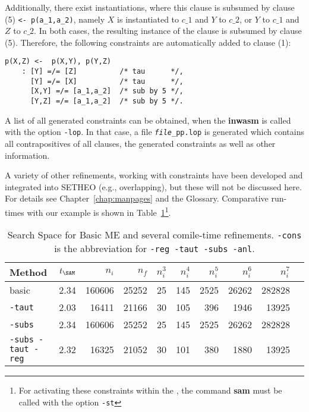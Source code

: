 Additionally, there exist instantiations, where this clause is subsumed
by clause (5) {\verb+<- p(a_1,a_2)+}, namely $X$ is instantiated
to $c\_1$ and $Y$ to $c\_2$, or $Y$ to $c\_1$ and $Z$ to $c\_2$.
In both cases, the resulting instance of the clause is subsumed by
clause (5).
Therefore, the following constraints are automatically added to
clause (1):

\begin{center}
\begin{verbatim}
p(X,Z) <-  p(X,Y), p(Y,Z)
    : [Y] =/= [Z]          /* tau      */, 
      [Y] =/= [X]          /* tau      */, 
      [X,Y] =/= [a_1,a_2]  /* sub by 5 */, 
      [Y,Z] =/= [a_1,a_2]  /* sub by 5 */.
\end{verbatim}
\end{center}

A list of all generated constraints can be obtained, when the {\bf inwasm}
is called with the option {\tt -lop}. In that case, a file 
{\tt {\em file}\_pp.lop} is generated which contains all contrapositives
of all clauses, the generated constraints as well as other information.

A variety of other refinements, working with constraints have been
developed and integrated into SETHEO (e.g., overlapping), 
but these will not be discussed
here. For details see Chapter~\ref{chap:manpages} and the Glossary.
Comparative run-times with our example is shown in 
Table~\ref{tab:tut2:results.constr}\footnote{
	For activating these constraints within the \SAM, the command
	{\bf sam} must be called with the option {\tt -st}}.

\begin{table}[htb]
\begin{center}
\begin{tabular}{|l|r|r|r||r|r|r|r|r|r|}
\hline
Method & $t_{\SAM}$ & $n_i$ & $n_f$ & 
	$n_i^3$ & $n_i^4$ & $n_i^5$ & $n_i^6$ & $n_i^7$ \\
\hline\hline
basic & 2.34 & 160606 & 25252 &
	25 & 145 & 2525 & 26262 & 282828 \\
\hline
{\tt -taut} & 2.03 & 16411 & 21166 &
	30 & 105 & 396 & 1946 & 13925 \\
\hline
{\tt -subs} & 2.34 & 160606 & 25252 &
	25 & 145 & 2525 & 26262 & 282828 \\
\hline
{\tt -subs -taut -reg} & 2.32 & 16325 & 21052 &
	30 & 101 & 380 & 1880 & 13925 \\
\hline\hline
\end{tabular}
\end{center}
\caption{Search Space for Basic ME and several comile-time
refinements. {\tt -cons} is the abbreviation for
	{\tt -reg -taut -subs -anl}.}
\label{tab:tut2:results.constr}
\end{table}

